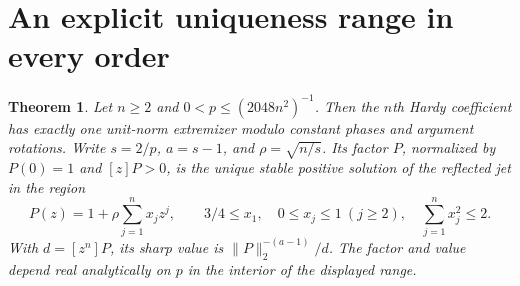 \documentclass[11pt]{article}
\newtheorem{theorem}{Theorem}
\begin{document}
\section{An explicit uniqueness range in every order}

\begin{theorem}\label{thm:explicit-small-p}
Let \(n\geq2\) and \(0<p\leq(2048n^2)^{-1}\).
Then the \(n\)th Hardy coefficient has exactly one unit-norm
extremizer modulo constant phases and argument rotations.
Write \(s=2/p\), \(a=s-1\), and \(\rho=\sqrt{n/s}\).
Its factor \(P\), normalized by \(P(0)=1\) and \([z]P>0\),
is the unique stable positive solution of the reflected jet
in the region
\[
 P(z)=1+\rho\sum_{j=1}^n x_j z^j,\qquad
 3/4\leq x_1,\quad 0\leq x_j\leq1\ (j\geq2),\quad
 \sum_{j=1}^n x_j^2\leq2.
\]
With \(d=[z^n]P\), its sharp value is
\(\|P\|_2^{-(a-1)}/d\).
The factor and value depend real analytically on \(p\) in the
interior of the displayed range.
\end{theorem}
\end{document}
